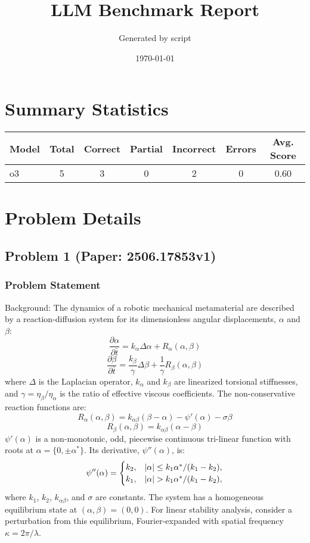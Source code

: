 \documentclass[10pt]{article}
\title{LLM Benchmark Report}
\author{Generated by script}
\date{\today}
\begin{document}
\maketitle

\section*{Summary Statistics}
\begin{center}
\begin{longtable}{|l|c|c|c|c|c|c|}
\hline
\textbf{Model} & \textbf{Total} & \textbf{Correct} & \textbf{Partial} & \textbf{Incorrect} & \textbf{Errors} & \textbf{Avg. Score} \\
\hline
\endfirsthead
\hline
\endfoot
o3 & 5 & 3 & 0 & 2 & 0 & 0.60 \\
\hline
\end{longtable}
\end{center}
\section*{Problem Details}

\subsection*{Problem 1 (Paper: 2506.17853v1)}
\subsubsection*{Problem Statement}
Background:
The dynamics of a robotic mechanical metamaterial are described by a reaction-diffusion system for its dimensionless angular displacements, $\alpha$ and $\beta$:
$$
\frac{\partial \alpha}{\partial \bar{t}} = k_\alpha \Delta \alpha + R_\alpha(\alpha,\beta)
$$
$$
\frac{\partial \beta}{\partial \bar{t}} = \frac{k_\beta}{\gamma} \Delta \beta + \frac{1}{\gamma}R_\beta(\alpha,\beta)
$$
where $\Delta$ is the Laplacian operator, $k_\alpha$ and $k_\beta$ are linearized torsional stiffnesses, and $\gamma = \eta_\beta/\eta_\alpha$ is the ratio of effective viscous coefficients. The non-conservative reaction functions are:
$$
R_{\alpha}(\alpha,\beta) = k_{\alpha\beta} (\beta-\alpha)-\psi'(\alpha)-\sigma\beta
$$
$$
R_{\beta}(\alpha,\beta) = k_{\alpha\beta} (\alpha-\beta)
$$
$\psi'(\alpha)$ is a non-monotonic, odd, piecewise continuous tri-linear function with roots at $\alpha=\{0,\pm\alpha^*\}$. Its derivative, $\psi''(\alpha)$, is:
$$
\psi''(\alpha)=\begin{cases}
		k_2, & |\alpha|\leq k_1\alpha^*/(k_1-k_2),
		\cr k_1, & |\alpha|>k_1\alpha^*/(k_1-k_2),
	\end{cases}
$$
where $k_1$, $k_2$, $k_{\alpha\beta}$, and $\sigma$ are constants. The system has a homogeneous equilibrium state at $(\alpha,\beta)=(0,0)$. For linear stability analysis, consider a perturbation from this equilibrium, Fourier-expanded with spatial frequency $\kappa=2\pi/\lambda$.
\end{document}

